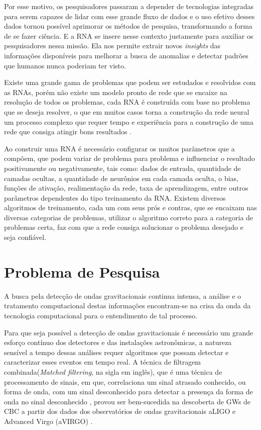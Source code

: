 Por esse motivo, os pesquisadores passaram a depender de tecnologias integradas para serem capazes de lidar com esse grande fluxo de dados e o uso efetivo desses dados tornou possível aprimorar os métodos de pesquisa, transformando a forma de se fazer ciência. E a RNA se insere nesse contexto justamente para auxiliar os pesquisadores nessa missão. Ela nos permite extrair novos \textit{insights} das informações disponíveis para melhorar a busca de anomalias e detectar padrões que humanos nunca poderiam ter visto.

Existe uma grande gama de problemas que podem ser estudados e resolvidos com as RNAs, porém não existe um modelo pronto de rede que se encaixe na resolução de todos os problemas, cada RNA é construída com base no problema que se deseja resolver, o que em muitos casos torna a construção da rede neural um processo complexo que requer tempo e experiência para a construção de uma rede que consiga atingir bons resultados \cite{barros2018avaliaccao}. 

Ao construir uma RNA é necessário configurar os muitos parâmetros que a compõem, que podem variar de problema para problema e influenciar o resultado positivamente ou negativamente, tais como: dados de entrada, quantidade de camadas ocultas, a quantidade de neurônios em cada camada oculta, o bias, funções de ativação, realimentação da rede, taxa de aprendizagem, entre outros parâmetros dependentes do tipo treinamento da RNA. Existem diversos algoritmos de treinamento, cada um com seus prós e contras, que se encaixam nas diversas categorias de problemas, utilizar o algoritmo correto para a categoria de problemas certa, faz com que a rede consiga solucionar o problema desejado e seja confiável.

\section{Problema de Pesquisa}

A busca pela detecção de ondas gravitacionais continua intensa, a análise e o tratamento computacional destas informações encontram-se na crisa da onda da tecnologia computacional para o entendimento de tal processo.

Para que seja possível a detecção de ondas gravitacionais é necessário um grande esforço contínuo dos detectores e das instalações astronômicas, a natureza sensível a tempo dessas análises requer algoritmos que possam detectar e caracterizar esses eventos em tempo real. A técnica de filtragem combinada(\textit{Matched filtering}, na sigla em inglês), que é uma técnica de processamento de sinais, em que, correlaciona um sinal atrasado conhecido, ou forma de onda, com um sinal desconhecido para detectar a presença da forma de onda no sinal desconhecido \cite{turin1960introduction, Schutz_1999}, provou ser bem-sucedida na descoberta de GWs de CBC a partir dos dados dos observatórios de ondas gravitacionais aLIGO e Advanced Virgo (aVIRGO) \cite{gebhard2019convolutional}.

